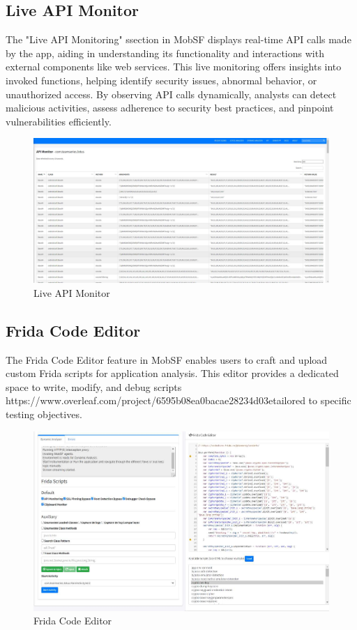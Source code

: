 \documentclass{report}
\begin{document}
\subsection{Live API Monitor}
The "Live API Monitoring" ssection in MobSF displays real-time API calls made by the app, aiding in understanding its functionality and interactions with external components like web services. This live monitoring offers insights into invoked functions, helping identify security issues, abnormal behavior, or unauthorized access. By observing API calls dynamically, analysts can detect malicious activities, assess adherence to security best practices, and pinpoint vulnerabilities efficiently. 

\begin{figure}[hbt!]
    \centering
    \includegraphics[width=1\linewidth]{Dynamic Analyzer/liveapimonitor.jpg}
    \caption{Live API Monitor}
    \label{fig:example}
\end{figure}
\FloatBarrier

\subsection{Frida Code Editor}
The Frida Code Editor feature in MobSF enables users to craft and upload custom Frida scripts for application analysis. This editor provides a dedicated space to write, modify, and debug scripts https://www.overleaf.com/project/6595b08ea0bacae28234d03etailored to specific testing objectives.
\begin{figure}[hbt!]
    \centering
    \includegraphics[width=1\linewidth]{Dynamic Analyzer/frida.jpg}
    \caption{Frida Code Editor}
    \label{fig:example}
\end{figure}
\FloatBarrier
\end{document}

